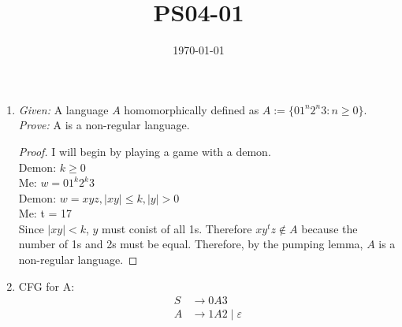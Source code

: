 \documentclass{article}
\title{PS04-01}
\date{\today}
\begin{document}
\maketitle
\begin{enumerate}[label=\alph*.]
	\item \textit{Given: } A language $A$ homomorphically defined as $A := \{01^n2^n3 : n \geq 0\}$.\\
	\textit{Prove: } A is a non-regular language.
	\begin{proof}
	I will begin by playing a game with a demon.\\
	Demon: $k \geq 0$\\
	Me: $w = 01^k2^k3$\\
	Demon: $w = xyz, \mid xy \mid \leq k, \mid y \mid > 0$\\
	Me: t = 17\\
	Since $\mid xy \mid < k$, $y$ must conist of all 1s. Therefore $xy^tz \notin A$ because the number of 1s and 2s must be equal. Therefore, by the pumping lemma, $A$ is a non-regular language. 
	\end{proof}
	\item CFG for A:\\
	\begin{align*}
		S &\rightarrow 0A3\\
		A &\rightarrow 1A2 \mid \varepsilon
	\end{align*}
\end{enumerate}
\end{document}
